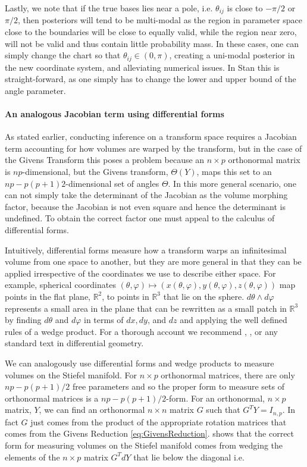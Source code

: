 \documentclass{article}
\begin{document}
Lastly, we note that if the true bases lies near a pole, i.e. $\theta_{ij}$ is close to $-\pi/2$ or $\pi/2$, then posteriors will tend to be multi-modal as the region in parameter space close to the boundaries will be close to equally valid, while the region near zero, will not be valid and thus contain little probability mass. In these cases, one can simply change the chart so that $\theta_{ij} \in (0, \pi)$, creating a uni-modal posterior in the new coordinate system, and alleviating numerical issues. In Stan this is straight-forward, as one simply has to change the lower and upper bound of the angle parameter.

\paragraph{An analogous Jacobian term using differential forms} As stated earlier, conducting inference on a transform space requires a Jacobian term accounting for how volumes are warped by the transform, but in the case of the Givens Transform this poses a problem because an $n \times p$ orthonormal matrix is $np$-dimensional, but the Givens transform, $\Theta(Y)$, maps this set to an $np - p(p+1)2$-dimensional set of angles $\Theta$. In this more general scenario, one can not simply take the determinant of the Jacobian as the volume morphing factor, because the Jacobian is not even square and hence the determinant is undefined. To obtain the correct factor one must appeal to the calculus of differential forms. 

Intuitively, differential forms measure how a transform warps an infinitesimal volume from one space to another, but they are more general in that they can be applied irrespective of the coordinates we use to describe either space. For example, spherical coordinates $(\theta, \varphi) \mapsto (x(\theta,\varphi), y(\theta,\varphi), z(\theta,\varphi))$ map points in the flat plane, $\mathbb{R}^2$, to points in $\mathbb{R}^3$ that lie on the sphere. $d\theta \wedge d\varphi$ represents a small area in the plane that can be rewritten as a small patch in $\mathbb{R}^3$ by finding $d\theta$ and $d\varphi$ in terms of $dx, dy$, and $dz$ and applying the well defined rules of a wedge product. For a thorough account we recommend \citet{muirhead2009aspects}, \citet{edelman200518}, or any standard text in differential geometry.

We can analogously use differential forms and wedge products to measure volumes on the Stiefel manifold. For $n \times p$ orthonormal matrices, there are only $np-p(p+1)/2$ free parameters and so the proper form to measure sets of orthonormal matrices is a $np-p(p+1)/2$-form. For an orthonormal, $n \times p$ matrix, $Y$, we can find an orthonormal $n \times n$ matrix $G$ such that $G^T Y = I_{n,p}$. In fact $G$ just comes from the product of the appropriate rotation matrices that comes from the Givens Reduction \ref{eq:GivensReduction}. \citet{muirhead2009aspects} shows that the correct form for measuring volumes on the Stiefel manifold comes from wedging the elements of the $n \times p$ matrix $G^T dY$ that lie below the diagonal i.e.
\end{document}
